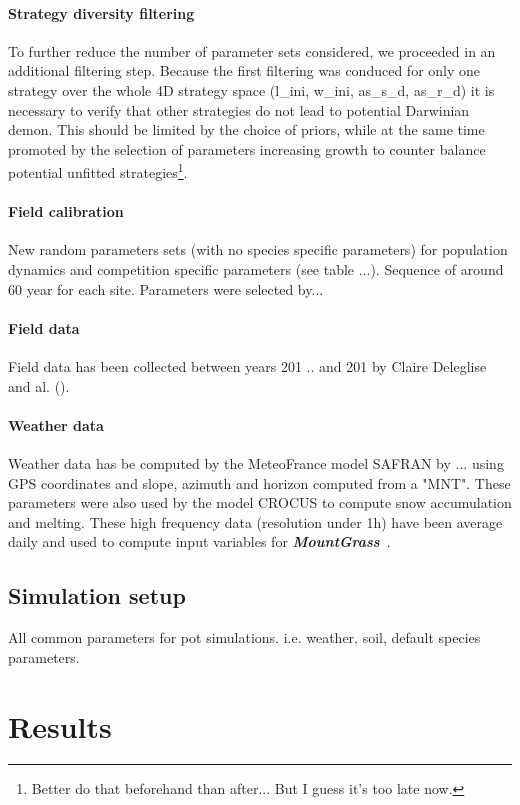 \documentclass[review]{elsarticle}
\newcommand{\model}{\textbf{\textit{MountGrass}}~}
\begin{document}
\paragraph{Strategy diversity filtering}
To further reduce the number of parameter sets considered, we proceeded in an additional filtering step. Because the first filtering was conduced for only one strategy over the whole 4D strategy space (l\_ini,  w\_ini, as\_s\_d, as\_r\_d) it is necessary to verify that other strategies do not lead to potential Darwinian demon. This should be limited by the choice of priors, while at the same time promoted by the selection of parameters increasing growth to counter balance potential unfitted strategies\footnote{Better do that beforehand than after... But I guess it's too late now.}.

\paragraph{Field calibration}
New random parameters sets (with no species specific parameters) for population dynamics and competition specific parameters (see table ...).
Sequence of around 60 year for each site. Parameters were selected by...


\paragraph{Field data}
Field data has been collected between years 201 .. and 201 by Claire Deleglise and al. ().

\paragraph{Weather data}
Weather data has be computed by the MeteoFrance model SAFRAN by ... using GPS coordinates and slope, azimuth and horizon computed from a "MNT". These parameters were also used by the model CROCUS to compute snow accumulation and melting. These high frequency data (resolution under 1h) have been average daily and used to compute input variables for \model . 

\subsection{Simulation setup}
All common parameters for pot simulations. i.e. weather, soil, default species parameters.



\section{Results}
\end{document}
